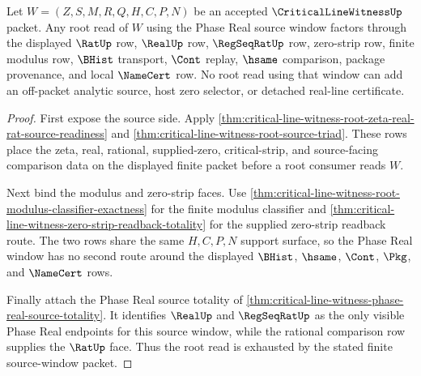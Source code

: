 \begin{theorem}
\label{thm:critical-line-witness-phase-real-source-window-exhaustion}
Let $W=(Z,S,M,R,Q,H,C,P,N)$ be an accepted $\CriticalLineWitnessUp$ packet. Any root read of $W$ using the Phase Real source window factors through the displayed $\RatUp$ row, $\RealUp$ row, $\RegSeqRatUp$ row, zero-strip row, finite modulus row, $\BHist$ transport, $\Cont$ replay, $\hsame$ comparison, package provenance, and local $\NameCert$ row. No root read using that window can add an off-packet analytic source, host zero selector, or detached real-line certificate.
\end{theorem}
\begin{proof}
First expose the source side. Apply \autoref{thm:critical-line-witness-root-zeta-real-rat-source-readiness} and \autoref{thm:critical-line-witness-root-source-triad}. These rows place the zeta, real, rational, supplied-zero, critical-strip, and source-facing comparison data on the displayed finite packet before a root consumer reads $W$.

Next bind the modulus and zero-strip faces. Use \autoref{thm:critical-line-witness-root-modulus-classifier-exactness} for the finite modulus classifier and \autoref{thm:critical-line-witness-zero-strip-readback-totality} for the supplied zero-strip readback route. The two rows share the same $H,C,P,N$ support surface, so the Phase Real window has no second route around the displayed $\BHist$, $\hsame$, $\Cont$, $\Pkg$, and $\NameCert$ rows.

Finally attach the Phase Real source totality of \autoref{thm:critical-line-witness-phase-real-source-totality}. It identifies $\RealUp$ and $\RegSeqRatUp$ as the only visible Phase Real endpoints for this source window, while the rational comparison row supplies the $\RatUp$ face. Thus the root read is exhausted by the stated finite source-window packet.
\end{proof}

